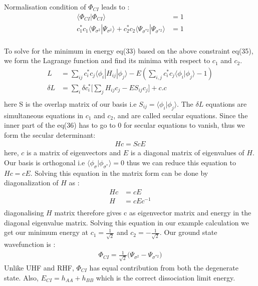 \documentclass[11pt]{article}   	%
\begin{document}
	Normalisation condition of $\Phi_{CI}$ leads to :\\
	\begin{equation}
	\begin{split}
		\langle\Phi_{CI}|\Phi_{CI}\rangle&=1\\
		c_1^*c_1\langle\Psi_{\sigma^2}|\Psi_{\sigma^2}\rangle+c_2^*c_2\langle\Psi_{\sigma^{*2}}|\Psi_{\sigma^{*2}}\rangle&=1\\
	\end{split}	
	\end{equation}
	
	To solve for the minimum in energy eq(33) based on the above constraint eq(35), we form the Lagrange function and
	 find its minima with respect to $c_1$ and $c_2$.  
	\begin{equation}
	\begin{split}
	L&=\sum_{ij}c_i^*c_j\langle\phi_i|H_{ij}|\phi_j\rangle-E(\sum_{i,j}c_i^*c_j\langle\phi_i|\phi_j\rangle-1)\\
	\delta L&=\sum_i\delta c_i^*\big[\sum_j H_{ij}c_j-ES_{ij}c_j\big]+c.c\\
	\end{split}
	\end{equation}
	here S is the overlap matrix of our basis i.e $S_{ij}=\langle\phi_{i}|\phi_{j}\rangle$. The $\delta L$ equations are simultaneous 
	equations in $c_1$ and $c_2$, and are called secular equations. Since the inner part of the 
	eq(36) has to go to 0 for secular equations to vanish, thus we form
	the secular determinant:\\
	\begin{equation}
	\begin{split}
		Hc=ScE
	\end{split}
	\end{equation}
	here, $c$ is a matrix of eigenvectors and $E$ is a diagonal matrix of eigenvalues of $H$.\\

	Our basis is orthogonal i.e $\langle\phi_{\sigma}|\phi_{\sigma^*}\rangle=0$ thus we can reduce this equation to $Hc=cE$. Solving this equation in the 
	matrix form can be done by diagonalization of $H$ as :
	\begin{equation}
	\begin{split}
		Hc&=cE\\
		H&=cEc^{-1}\\
	\end{split}
	\end{equation}
	diagonalising $H$ matrix therefore gives c as eigenvector matrix and energy in the diagonal 
	eigenvalue matrix. Solving this equation in our example calculation
	 we get our minimum energy at $c_1=\frac{1}{\sqrt{2}}$ and $c_2=-\frac{1}{\sqrt{2}}$. Our
	 ground state wavefunction is :\\
	\begin{equation}
	\begin{split}
		\Phi_{CI}=\frac{1}{\sqrt{2}}\big(\Psi_{\sigma^2}-\Psi_{\sigma^{*2}}\big)
	\end{split}
	\end{equation}
	Unlike UHF and RHF, $\Phi_{CI}$ has equal contribution from both the degenerate state. 
	Also, $E_{CI}=h_{AA}+h_{BB}$ which is the correct dissociation limit energy.\\ 
\end{document}
